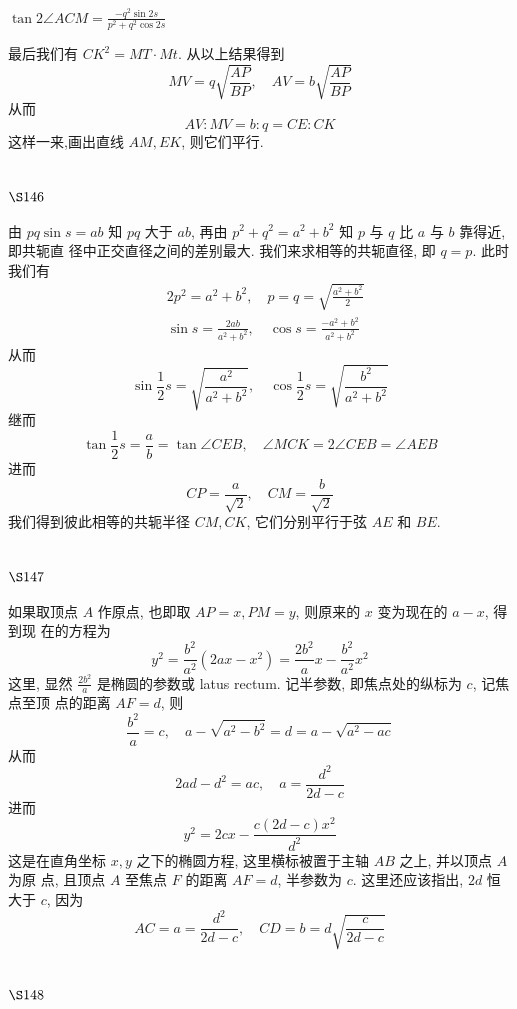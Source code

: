 $\tan 2 \angle A C M=\frac{-q^{2} \sin 2 s}{p^{2}+q^{2} \cos 2 s}$

最后我们有 $C K^{2}=M T \cdot M t$. 从以上结果得到
\[
M V=q \sqrt{\frac{A P}{B P}}, \quad A V=b \sqrt{\frac{A P}{B P}}
\]
从而
\[
A V: M V=b: q=C E: C K
\]
这样一来,画出直线 $A M, E K$, 则它们平行.

\section{$\S 146$}

由 $p q \sin s=a b$ 知 $p q$ 大于 $a b$, 再由 $p^{2}+q^{2}=a^{2}+b^{2}$ 知 $p$ 与 $q$ 比 $a$ 与 $b$ 靠得近, 即共轭直 径中正交直径之间的差别最大. 我们来求相等的共轭直径, 即 $q=p$. 此时我们有
\[
\begin{aligned}
& 2 p^{2}=a^{2}+b^{2}, \quad p=q=\sqrt{\frac{a^{2}+b^{2}}{2}} \\
& \sin s=\frac{2 a b}{a^{2}+b^{2}}, \quad \cos s=\frac{-a^{2}+b^{2}}{a^{2}+b^{2}}
\end{aligned}
\]
从而
\[
\sin \frac{1}{2} s=\sqrt{\frac{a^{2}}{a^{2}+b^{2}}}, \quad \cos \frac{1}{2} s=\sqrt{\frac{b^{2}}{a^{2}+b^{2}}}
\]
继而
\[
\tan \frac{1}{2} s=\frac{a}{b}=\tan \angle C E B, \quad \angle M C K=2 \angle C E B=\angle A E B
\]
进而
\[
C P=\frac{a}{\sqrt{2}}, \quad C M=\frac{b}{\sqrt{2}}
\]
我们得到彼此相等的共轭半径 $C M, C K$, 它们分别平行于弦 $A E$ 和 $B E$.

\section{$\S 147$}

如果取顶点 $A$ 作原点, 也即取 $A P=x, P M=y$, 则原来的 $x$ 变为现在的 $a-x$, 得到现 在的方程为
\[
y^{2}=\frac{b^{2}}{a^{2}}\left(2 a x-x^{2}\right)=\frac{2 b^{2}}{a} x-\frac{b^{2}}{a^{2}} x^{2}
\]
这里, 显然 $\frac{2 b^{2}}{a}$ 是椭圆的参数或 latus rectum. 记半参数, 即焦点处的纵标为 $c$, 记焦点至顶 点的距离 $A F=d$, 则
\[
\frac{b^{2}}{a}=c, \quad a-\sqrt{a^{2}-b^{2}}=d=a-\sqrt{a^{2}-a c}
\]
从而
\[
2 a d-d^{2}=a c, \quad a=\frac{d^{2}}{2 d-c}
\]
进而
\[
y^{2}=2 c x-\frac{c(2 d-c) x^{2}}{d^{2}}
\]
这是在直角坐标 $x, y$ 之下的椭圆方程, 这里横标被置于主轴 $A B$ 之上, 并以顶点 $A$ 为原 点, 且顶点 $A$ 至焦点 $F$ 的距离 $A F=d$, 半参数为 $c$. 这里还应该指出, $2 d$ 恒大于 $c$, 因为
\[
A C=a=\frac{d^{2}}{2 d-c}, \quad C D=b=d \sqrt{\frac{c}{2 d-c}}
\]
\section{$\S 148$}

